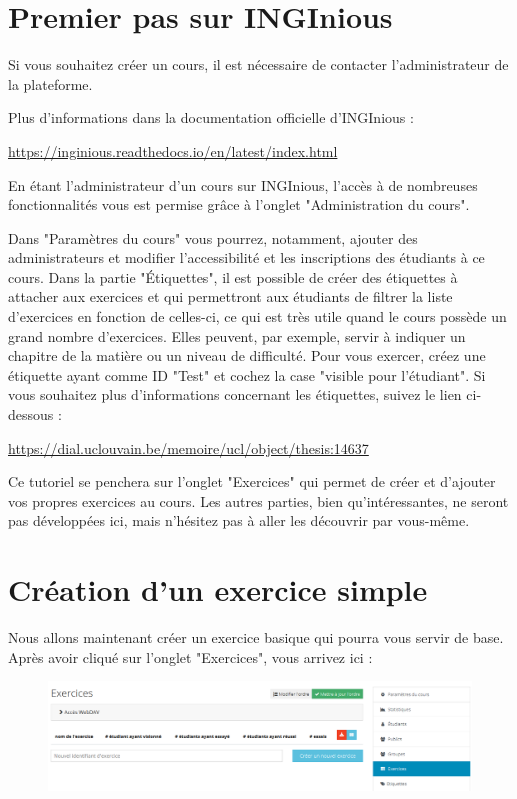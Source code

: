 \documentclass{article}
\begin{document}


\tableofcontents
\thispagestyle{empty}
\setcounter{page}{0}
\newpage

\section{Premier pas sur INGInious}

Si vous souhaitez créer un cours, il est nécessaire de contacter l'administrateur de la plateforme. 

Plus d'informations dans la documentation officielle d'INGInious : 
\bigskip

\url{https://inginious.readthedocs.io/en/latest/index.html}

\bigskip
En étant l'administrateur d'un cours sur INGInious, l'accès à de nombreuses fonctionnalités vous est permise grâce à l'onglet "Administration du cours". 

Dans "Paramètres du cours" vous pourrez, notamment, ajouter des administrateurs et modifier l'accessibilité et les inscriptions des étudiants à ce cours. Dans la partie "Étiquettes", il est possible de créer des étiquettes à attacher aux exercices et qui permettront aux étudiants de filtrer la liste d'exercices en fonction de celles-ci, ce qui est très utile quand le cours possède un grand nombre d'exercices. Elles peuvent, par exemple, servir à indiquer un chapitre de la matière ou un niveau de difficulté. Pour vous exercer, créez une étiquette ayant comme ID "Test" et cochez la case "visible pour l'étudiant". Si vous souhaitez plus d'informations concernant les étiquettes, suivez le lien ci-dessous :
\bigskip

\url{https://dial.uclouvain.be/memoire/ucl/object/thesis:14637}
\bigskip

Ce tutoriel se penchera sur l'onglet "Exercices" qui permet de créer et d'ajouter vos propres exercices au cours. Les autres parties, bien qu'intéressantes, ne seront pas développées ici, mais n'hésitez pas à aller les découvrir par vous-même. 

\section{Création d'un exercice simple}

Nous allons maintenant créer un exercice basique qui pourra vous servir de base. Après avoir cliqué sur l'onglet "Exercices", vous arrivez ici :

\begin{figure}[h]
    \centering
    \includegraphics[scale=0.5]{images/Exercices.PNG}
\end{figure}
\end{document}
